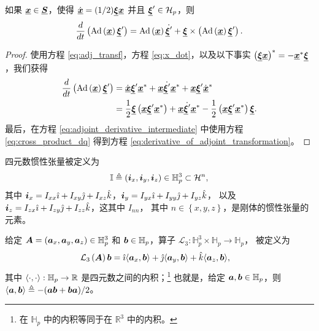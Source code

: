 \begin{lemma}\label{lem:derivative_of_adjoint_transformation}

如果 $\dq x\in\mathcal{\dq S}$，使得 $\dot{\dq x}=(1/2)\dq{\xi}\dq x$
并且 $\dq{\xi}'\in\mathcal{H}_{p}$，则
\begin{equation}
\frac{d}{dt}\left(\ad{\dq x}{\dq{\xi}'}\right)=\ad{\dq x}{\dot{\dq{\xi}'}}+\dq{\xi}\times\left(\ad{\dq x}{\dq{\xi}'}\right).\label{eq:derivative_of_adjoint_transformation}
\end{equation}

\end{lemma}

\begin{proof}

使用方程 \eqref{eq:adj_transf}，方程 \eqref{eq:x_dot}，以及以下事实
$\left(\dq{\xi}\dq x\right)^{*}=-\dq x^{*}\dq{\xi}$，我们获得
\begin{align}
\frac{d}{dt}\left(\ad{\dq x}{\dq{\xi}}'\right) & =\dot{\dq x}\dq{\xi}'\dq x^{*}+\dq x\dot{\dq{\xi}'}\dq x^{*}+\dq x\dq{\xi}'\dot{\dq x}^{*}\nonumber \\
 & =\frac{1}{2}\dq{\xi}\left(\dq x\dq{\xi}'\dq x^{*}\right)+\dq x\dot{\dq{\xi}'}\dq x^{*}-\frac{1}{2}\left(\dq x\dq{\xi}'\dq x^{*}\right)\dq{\xi}.\label{eq:adjoint_derivative_intermediate}
\end{align}
最后，在方程 \eqref{eq:adjoint_derivative_intermediate} 中使用方程 \eqref{eq:cross_product_dq} 得到方程 \eqref{eq:derivative_of_adjoint_transformation}。

\end{proof}

四元数惯性张量被定义为
\begin{equation}
\quat{\mathbb{I}}\triangleq\left(\quat i_{x},\quat i_{y},\quat i_{z}\right)\in\mathbb{H}_{p}^{3}\subset\mathcal{H}^{n},\label{eq:quat_inertia_tensor}
\end{equation}
其中 $\quat i_{x}=I_{xx}\imi+I_{xy}\imj+I_{xz}\imk$，$\quat i_{y}=I_{yx}\imi+I_{yy}\imj+I_{yz}\imk$，
以及 $\quat i_{z}=I_{zx}\imi+I_{zy}\imj+I_{zz}\imk$，这其中 $I_{nn}$，
其中 $n\in\left\{ x,y,z\right\} $，是刚体的惯性张量的元素。

\begin{definition}\label{def_operator_l}

给定 $\quat A=\left(\quat a_{x},\quat a_{y},\quat a_{z}\right)\in\mathbb{H}_{p}^{3}$
和 $\quat b\in\mathbb{H}_{p}$，算子 $\mathcal{L}_{3}:\mathbb{H}_{p}^{3}\times\mathbb{H}_{p}\to\mathbb{H}_{p}$，
被定义为
\begin{align}
\mathcal{L}_{3}\left(\quat A\right)\quat b & =\imi\dotproduct{\quat a_{x},\quat b}+\imj\dotproduct{\quat a_{y},\quat b}+\imk\dotproduct{\quat a_{z},\quat b},\label{eq:operator_l}
\end{align}
其中 $\dotproduct{\cdot,\cdot}:\mathbb{H}_{p}\to\mathbb{R}$ 是四元数之间的内积；\footnote{在 $\mathbb{H}_{p}$ 中的内积等同于在 $\mathbb{R}^{3}$ 中的内积。} 也就是，给定 $\quat a,\quat b\in\mathbb{H}_{p}$，则 $\dotproduct{\quat a,\quat b}\triangleq-(\quat{ab}+\quat{ba})/2$。

\end{definition}

